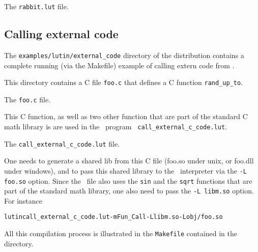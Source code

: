 \begin{example}
The {\tt rabbit.lut} file.
\begin{alltt}
\begin{small}

\end{small}
\end{alltt}
\end{example}


\subsection{Calling external code}
\label{call-extern-c-code}

The  {\tt  examples/lutin/external\_code}  directory of  the  \lutin
distribution contains a complete running (via the Makefile) example
of calling extern code from \lutin.

This  directory  contains a  C  file {\tt  foo.c}  that  defines a  C
function {\tt  rand\_up\_to}. 


\begin{example}
The {\tt foo.c} file.
\begin{alltt}
\begin{small}

\end{small}
\end{alltt}
\end{example}

This C function,  as well as two other function that  are part of the
standard  C  math library  is  are used  in  the  \lutin\ program  {\tt
  call\_external\_c\_code.lut}.

\begin{example}
The {\tt call\_external\_c\_code.lut} file. 
\begin{alltt}
\begin{small}

\end{small}
\end{alltt}
\end{example}



One needs  to generate a  shared lib from  this C file  (foo.so under
unix, or foo.dll  under windows), and to pass  this shared library to
the \lutin\  interpreter via the  {\tt -L foo.so} option.   Since the
\lutin\ file  also uses  the {\tt sin}  and the {\tt  sqrt} functions
that are part of the standard math library, one also need to pass the
{\tt -L libm.so} option.  For instance

\begin{alltt}
  lutin call_external_c_code.lut -m Fun_Call -L libm.so -L obj/foo.so
\end{alltt}

All  this compilation process  is illustrated  in the  {\tt Makefile}
contained in the directory.

